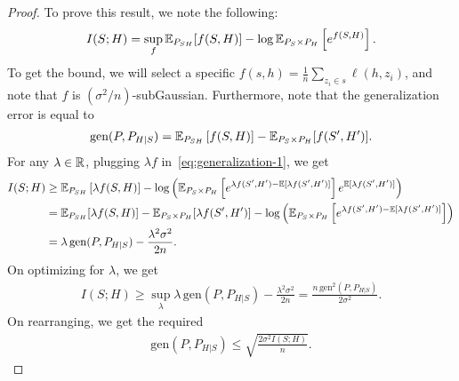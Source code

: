             \begin{proof}
                To prove this result, we note the following: 
                \begin{align}
                    I(S; H) = \sup_{f} \mathbb{E}_{P_{SH}}[f(S, H)] - \log \mathbb{E}_{P_S \times P_H}\left[ e^{f(S, H)} \right]. \label{eq:generalization-1}
                \end{align}
                To get the bound, we will select a specific $f(s, h) = \frac{1}{n} \sum_{z_i \in s} \ell(h, z_i)$, and note that $f$ is $(\sigma^2/n)$-subGaussian. Furthermore, note that the generalization error is equal to 
                \begin{align}
                    \text{gen}(P, P_{H|S}) = \mathbb{E}_{P_{SH}}\left[ f(S, H) \right] - \mathbb{E}_{P_{S} \times P_{H}}[f(S', H')]. 
                \end{align}
                For any $\lambda \in \mathbb{R}$, plugging  $\lambda f$ in~\eqref{eq:generalization-1}, we get 
                \begin{align}
                    I(S;H) &\geq \mathbb{E}_{P_{SH}}\left[ \lambda f(S, H) \right] - \log \left( \mathbb{E}_{P_S \times P_H}\left[ e^{\lambda f(S',H') - \mathbb{E}[\lambda f(S', H')]} \right] e^{\mathbb{E}[\lambda f(S',H')]} \right) \\
                    & = \mathbb{E}_{P_{SH}}[\lambda f(S, H)] - \mathbb{E}_{P_{S}\times P_H}[\lambda f(S', H')] - \log \left( \mathbb{E}_{P_S \times P_H}\left[ e^{\lambda f(S', H') - \mathbb{E}[\lambda f(S', H')]} \right] \right) \\
                    & = \lambda \, \text{gen}(P, P_{H|S}) - \frac{\lambda^2 \sigma^2}{2n}. 
                \end{align}
                On optimizing for $\lambda$, we get 
                \begin{align}
                    I(S; H) \geq \sup_{\lambda} \lambda \, \text{gen}(P, P_{H|S}) - \frac{\lambda^2 \sigma^2}{2n}  = \frac{n \, \text{gen}^2(P, P_{H|S})}{2 \sigma^2}. 
                \end{align}
                On rearranging, we get the required 
                \begin{align}
                    \text{gen}(P, P_{H|S}) \leq \sqrt{ \frac{ 2 \sigma^2 I(S; H)}{n}}. 
                \end{align}
            \end{proof}
            
            
            



